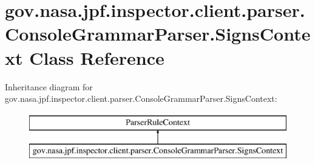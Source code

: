 \hypertarget{classgov_1_1nasa_1_1jpf_1_1inspector_1_1client_1_1parser_1_1_console_grammar_parser_1_1_signs_context}{}\section{gov.\+nasa.\+jpf.\+inspector.\+client.\+parser.\+Console\+Grammar\+Parser.\+Signs\+Context Class Reference}
\label{classgov_1_1nasa_1_1jpf_1_1inspector_1_1client_1_1parser_1_1_console_grammar_parser_1_1_signs_context}
Inheritance diagram for gov.\+nasa.\+jpf.\+inspector.\+client.\+parser.\+Console\+Grammar\+Parser.\+Signs\+Context\+:\begin{figure}[H]
\begin{center}
\leavevmode
\includegraphics[height=2.000000cm]{classgov_1_1nasa_1_1jpf_1_1inspector_1_1client_1_1parser_1_1_console_grammar_parser_1_1_signs_context}
\end{center}
\end{figure}
